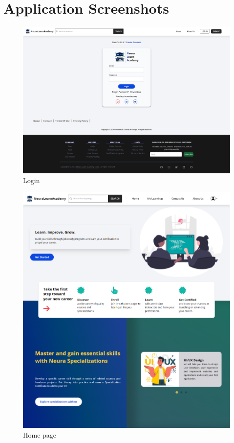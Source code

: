 \newpage 

\FloatBarrier
\section{Application Screenshots}

\begin{figure}[h!]
	\centering
	\includegraphics[max height=\textheight,max width=\textwidth]{figures/frontend/login.png}
	\caption{Login}
\end{figure}

\begin{figure}[h!]
	\centering
	\includegraphics[max height=\textheight,max width=\textwidth]{figures/frontend/Homepage.png}
	\caption{Home page}
\end{figure}

